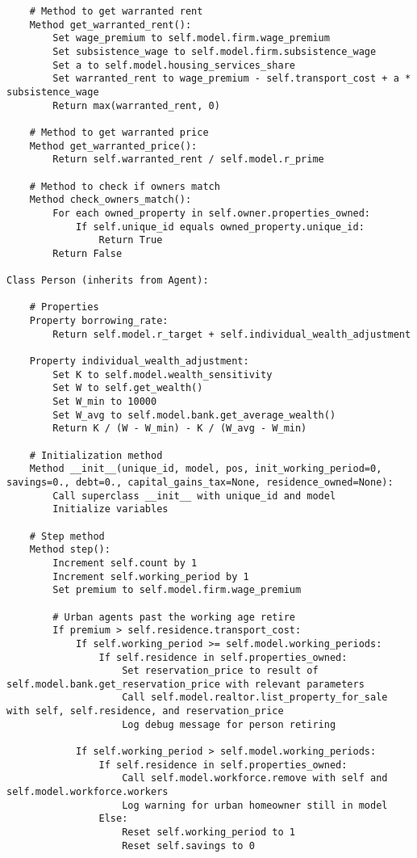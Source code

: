 {\begin{verbatim}
    # Method to get warranted rent
    Method get_warranted_rent():
        Set wage_premium to self.model.firm.wage_premium
        Set subsistence_wage to self.model.firm.subsistence_wage
        Set a to self.model.housing_services_share
        Set warranted_rent to wage_premium - self.transport_cost + a * subsistence_wage
        Return max(warranted_rent, 0)

    # Method to get warranted price
    Method get_warranted_price():
        Return self.warranted_rent / self.model.r_prime

    # Method to check if owners match
    Method check_owners_match():
        For each owned_property in self.owner.properties_owned:
            If self.unique_id equals owned_property.unique_id:
                Return True
        Return False

Class Person (inherits from Agent):

    # Properties
    Property borrowing_rate:
        Return self.model.r_target + self.individual_wealth_adjustment

    Property individual_wealth_adjustment:
        Set K to self.model.wealth_sensitivity
        Set W to self.get_wealth()
        Set W_min to 10000
        Set W_avg to self.model.bank.get_average_wealth()
        Return K / (W - W_min) - K / (W_avg - W_min)

    # Initialization method
    Method __init__(unique_id, model, pos, init_working_period=0, savings=0., debt=0., capital_gains_tax=None, residence_owned=None):
        Call superclass __init__ with unique_id and model
        Initialize variables

    # Step method
    Method step():
        Increment self.count by 1
        Increment self.working_period by 1
        Set premium to self.model.firm.wage_premium

        # Urban agents past the working age retire
        If premium > self.residence.transport_cost:
            If self.working_period >= self.model.working_periods:
                If self.residence in self.properties_owned:
                    Set reservation_price to result of self.model.bank.get_reservation_price with relevant parameters
                    Call self.model.realtor.list_property_for_sale with self, self.residence, and reservation_price
                    Log debug message for person retiring

            If self.working_period > self.model.working_periods:
                If self.residence in self.properties_owned:
                    Call self.model.workforce.remove with self and self.model.workforce.workers
                    Log warning for urban homeowner still in model
                Else:
                    Reset self.working_period to 1
                    Reset self.savings to 0


\end{verbatim}}
